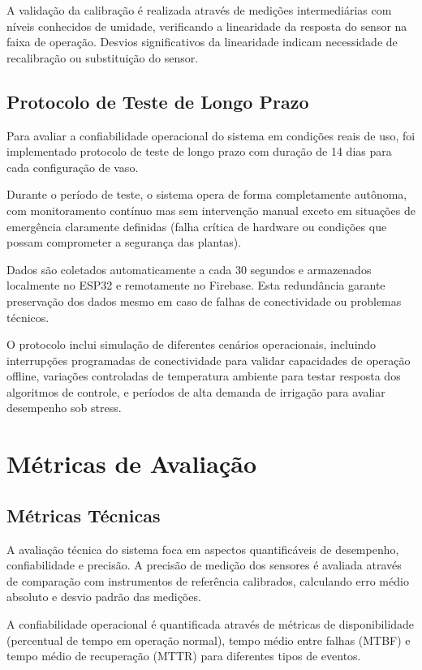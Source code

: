 \documentclass[twoside,english,brazilian]{UNISINOSmonografia}
\begin{document}
A validação da calibração é realizada através de medições intermediárias com níveis conhecidos de umidade, verificando a linearidade da resposta do sensor na faixa de operação. Desvios significativos da linearidade indicam necessidade de recalibração ou substituição do sensor.

\subsection{Protocolo de Teste de Longo Prazo}

Para avaliar a confiabilidade operacional do sistema em condições reais de uso, foi implementado protocolo de teste de longo prazo com duração de 14 dias para cada configuração de vaso.

Durante o período de teste, o sistema opera de forma completamente autônoma, com monitoramento contínuo mas sem intervenção manual exceto em situações de emergência claramente definidas (falha crítica de hardware ou condições que possam comprometer a segurança das plantas).

Dados são coletados automaticamente a cada 30 segundos e armazenados localmente no ESP32 e remotamente no Firebase. Esta redundância garante preservação dos dados mesmo em caso de falhas de conectividade ou problemas técnicos.

O protocolo inclui simulação de diferentes cenários operacionais, incluindo interrupções programadas de conectividade para validar capacidades de operação offline, variações controladas de temperatura ambiente para testar resposta dos algoritmos de controle, e períodos de alta demanda de irrigação para avaliar desempenho sob stress.

\section{Métricas de Avaliação}

\subsection{Métricas Técnicas}

A avaliação técnica do sistema foca em aspectos quantificáveis de desempenho, confiabilidade e precisão. A precisão de medição dos sensores é avaliada através de comparação com instrumentos de referência calibrados, calculando erro médio absoluto e desvio padrão das medições.

A confiabilidade operacional é quantificada através de métricas de disponibilidade (percentual de tempo em operação normal), tempo médio entre falhas (MTBF) e tempo médio de recuperação (MTTR) para diferentes tipos de eventos.
\end{document}
